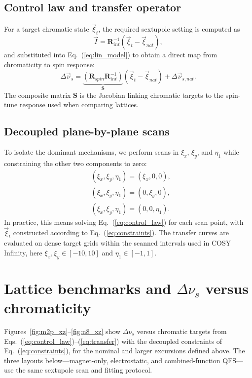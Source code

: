 \documentclass[%
               ]{jacow}
\begin{document}
\subsection{Control law and transfer operator}
\par For a target chromatic state \(\vec\xi_{t}\), the required sextupole setting is computed as
\begin{equation}
	\vec I = \mathbf{R}_{int}^{-1}\left(\vec\xi_{t}-\vec\xi_{nat}\right),
	\label{eq:control_law}
\end{equation}
\noindent and substituted into Eq.~(\ref{eq:lin_model}) to obtain a direct map from chromaticity to spin response:
\begin{equation}
	\Delta\vec\nu_s
	= \underbrace{\left(\mathbf{R}_{spin}\mathbf{R}_{int}^{-1}\right)}_{\mathbf{S}}
	\left(\vec\xi_{t}-\vec\xi_{nat}\right)+\Delta\vec\nu_{s,nat}.
	\label{eq:transfer}
\end{equation}
\noindent The composite matrix \(\mathbf{S}\) is the Jacobian linking chromatic targets to the spin-tune response used when comparing lattices.

\subsection{Decoupled plane-by-plane scans}
\par To isolate the dominant mechanisms, we perform scans in \(\xi_x\), \(\xi_y\), and \(\eta_1\) while constraining the other two components to zero:
\begin{align}
	&(\xi_x, \xi_y, \eta_1) = (\xi_x,0,0), \nonumber\\
	&(\xi_x, \xi_y, \eta_1) = (0,\xi_y,0), \nonumber\\
	&(\xi_x, \xi_y, \eta_1) = (0,0,\eta_1).
	\label{eq:constraints}
\end{align}
\noindent In practice, this means solving Eq.~(\ref{eq:control_law}) for each scan point, with \(\vec\xi_t\) constructed according to Eq.~(\ref{eq:constraints}). The transfer curves are evaluated on dense target grids within the scanned intervals used in COSY Infinity, here \(\xi_x,\xi_y\in[-10,10]\) and \(\eta_1\in[-1,1]\).

\section{Lattice benchmarks and \(\Delta\nu_s\) versus chromaticity}
\par Figures~\ref{fig:m2p_xz}--\ref{fig:n8_xz} show \(\Delta\nu_s\) versus chromatic targets from Eqs.~(\ref{eq:control_law})--(\ref{eq:transfer}) with the decoupled constraints of Eq.~(\ref{eq:constraints}), for the nominal and larger excursions defined above. The three layouts below---magnet-only, electrostatic, and combined-function QFS---use the same sextupole scan and fitting protocol.
\end{document}
